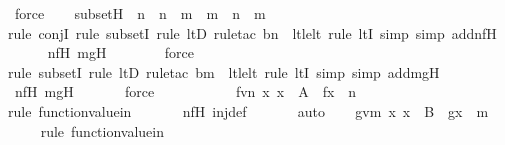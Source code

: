 \begin{isabellebody}
\ force\isanewline
\isanewline
\ \ \isamarkupfalse%
\ subsetH\ {\isacharcolon}{\kern0pt}\ {\isachardoublequoteopen}n\ {\isasymsubseteq}\ n\ {\isacharhash}{\kern0pt}{\isacharplus}{\kern0pt}\ m\ {\isasymand}\ m\ {\isasymsubseteq}\ n\ {\isacharhash}{\kern0pt}{\isacharplus}{\kern0pt}\ m{\isachardoublequoteclose}\ \isanewline
\ \ \ \ \isamarkupfalse%
{\isacharparenleft}{\kern0pt}rule\ conjI{\isacharcomma}{\kern0pt}\ rule\ subsetI{\isacharcomma}{\kern0pt}\ rule\ ltD{\isacharcomma}{\kern0pt}\ rule{\isacharunderscore}{\kern0pt}tac\ b{\isacharequal}{\kern0pt}n\ \ lt{\isacharunderscore}{\kern0pt}le{\isacharunderscore}{\kern0pt}lt{\isacharcomma}{\kern0pt}\ rule\ ltI{\isacharcomma}{\kern0pt}\ simp{\isacharcomma}{\kern0pt}\ simp\ add{\isacharcolon}{\kern0pt}nfH{\isacharparenright}{\kern0pt}\isanewline
\ \ \ \ \isamarkupfalse%
\ nfH\ mgH\ \isanewline
\ \ \ \ \ \isamarkupfalse%
\ force\ \isanewline
\ \ \ \ \isamarkupfalse%
{\isacharparenleft}{\kern0pt}rule\ subsetI{\isacharcomma}{\kern0pt}\ rule\ ltD{\isacharcomma}{\kern0pt}\ rule{\isacharunderscore}{\kern0pt}tac\ b{\isacharequal}{\kern0pt}m\ \ lt{\isacharunderscore}{\kern0pt}le{\isacharunderscore}{\kern0pt}lt{\isacharcomma}{\kern0pt}\ rule\ ltI{\isacharcomma}{\kern0pt}\ simp{\isacharcomma}{\kern0pt}\ simp\ add{\isacharcolon}{\kern0pt}mgH{\isacharparenright}{\kern0pt}\isanewline
\ \ \ \ \isamarkupfalse%
\ nfH\ mgH\ \isanewline
\ \ \ \ \isamarkupfalse%
\ force\ \isanewline
\ \ \ \ \isamarkupfalse%
\ \isanewline
\isanewline
\ \ \isamarkupfalse%
\ fvn{\isacharcolon}{\kern0pt}\ {\isachardoublequoteopen}{\isasymAnd}x{\isachardot}{\kern0pt}\ x\ {\isasymin}\ A\ {\isasymLongrightarrow}\ f{\isacharbackquote}{\kern0pt}x\ {\isasymin}\ n{\isachardoublequoteclose}\ \isanewline
\ \ \ \ \isamarkupfalse%
{\isacharparenleft}{\kern0pt}rule\ function{\isacharunderscore}{\kern0pt}value{\isacharunderscore}{\kern0pt}in{\isacharparenright}{\kern0pt}\ \isanewline
\ \ \ \ \isamarkupfalse%
\ nfH\ inj{\isacharunderscore}{\kern0pt}def\ \isanewline
\ \ \ \ \isamarkupfalse%
\ auto\isanewline
\ \ \isamarkupfalse%
\ gvm{\isacharcolon}{\kern0pt}\ {\isachardoublequoteopen}{\isasymAnd}x{\isachardot}{\kern0pt}\ x\ {\isasymin}\ B\ {\isasymLongrightarrow}\ g{\isacharbackquote}{\kern0pt}x\ {\isasymin}\ m{\isachardoublequoteclose}\ \isanewline
\ \ \ \ \isamarkupfalse%
{\isacharparenleft}{\kern0pt}rule\ function{\isacharunderscore}{\kern0pt}value{\isacharunderscore}{\kern0pt}in{\isacharparenright}{\kern0pt}\ \isanewline

\end{isabellebody}

